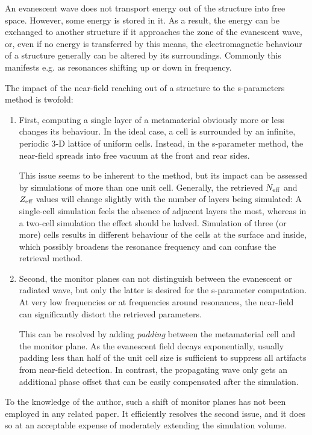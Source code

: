 An evanescent wave does not transport energy out of the structure into free space. However, some energy is stored in it. As a result, the energy can be exchanged to another structure if it approaches the zone of the evanescent wave, or, even if no energy is transferred by this means, the electromagnetic behaviour of a structure generally can be altered by its surroundings. Commonly this manifests e.g. as resonances shifting up or down in frequency.

The impact of the near-field reaching out of a structure to the s-parameters method is twofold:
\begin{enumerate}
 \item{First, computing a single layer of a metamaterial obviously more or less changes its behaviour. In the ideal case, a cell is surrounded by an infinite, periodic 3-D lattice of uniform cells.  Instead, in the s-parameter method, the near-field spreads into free vacuum at the front and rear sides. 

This issue seems to be inherent to the method, but its impact can be assessed by simulations of more than one unit cell. Generally, the retrieved $N_{\text{eff} }$ and $Z_{\text{eff} }$ values will change slightly with the number of layers being simulated: A single-cell simulation feels the absence of adjacent layers the most, whereas in a two-cell simulation the effect should be halved. Simulation of three (or more) cells results in different behaviour of the cells at the surface and inside, which possibly broadens the resonance frequency and can confuse the retrieval method.
 } 
 \item{Second, the monitor planes can not distinguish between the evanescent or radiated wave, but only the latter is desired for the s-parameter computation. At very low frequencies or at frequencies around resonances, the near-field can significantly distort the retrieved parameters.

This can be resolved by adding \textit{padding} between the metamaterial cell and the monitor plane. As the evanescent field decays exponentially, usually padding less than half of the unit cell size is sufficient to suppress all artifacts from near-field detection. In contrast, the propagating wave only gets an additional phase offset that can be easily compensated after the simulation. } 
 \end{enumerate}
To the knowledge of the author, such a shift of monitor planes has not been employed in any related paper. It efficiently resolves the second issue, and it does so at an acceptable expense of moderately extending the simulation volume.
